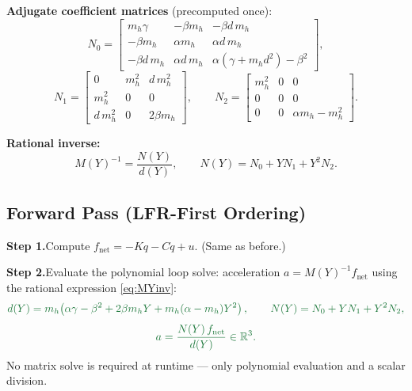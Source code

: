 \documentclass[11pt]{article}
\newcommand{\stepbox}[2]{%
  \noindent\textbf{Step #1.}\quad #2\par\medskip
}
\begin{document}
\noindent\textbf{Adjugate coefficient matrices} (precomputed once):
\begin{equation}
  N_0 =
  \begin{bmatrix}
    m_h\gamma      & -\beta m_h     & -\beta d\,m_h \\
    -\beta m_h     & \alpha m_h     & \alpha d\,m_h \\
    -\beta d\,m_h  & \alpha d\,m_h  & \alpha(\gamma + m_hd^2) - \beta^2
  \end{bmatrix},
  \label{eq:N0}
\end{equation}
\begin{equation}
  N_1 =
  \begin{bmatrix}
    0        & m_h^2    & d\,m_h^2 \\
    m_h^2    & 0        & 0        \\
    d\,m_h^2 & 0        & 2\beta m_h
  \end{bmatrix},
  \qquad
  N_2 =
  \begin{bmatrix}
    m_h^2 & 0 & 0 \\
    0     & 0 & 0 \\
    0     & 0 & \alpha m_h - m_h^2
  \end{bmatrix}.
  \label{eq:N1N2}
\end{equation}

\noindent\textbf{Rational inverse:}
\begin{equation}
  M(Y)^{-1} = \frac{N(Y)}{d(Y)},
  \qquad
  N(Y) = N_0 + Y N_1 + Y^2 N_2.
  \label{eq:MYinv}
\end{equation}

\subsection{Forward Pass (LFR-First Ordering)}

\stepbox{1}{Compute $f_{\mathrm{net}} = -Kq - C\dot{q} + u$.
\quad (Same as before.)}

\stepbox{2}{Evaluate the polynomial loop solve: acceleration $a = M(Y)^{-1}f_{\mathrm{net}}$
using the rational expression \eqref{eq:MYinv}:
\[
  {\color{newcolor}
  d(Y) = m_h\!\left(
    \alpha\gamma - \beta^2
    + 2\beta m_h Y + m_h(\alpha-m_h)Y^2
  \right),
  \qquad
  N(Y) = N_0 + YN_1 + Y^2N_2,
  }
\]
\[
  {\color{newcolor} a = \frac{N(Y)\,f_{\mathrm{net}}}{d(Y)} \in \mathbb{R}^3.}
\]
No matrix solve is required at runtime — only polynomial evaluation and
a scalar division.}
\end{document}
